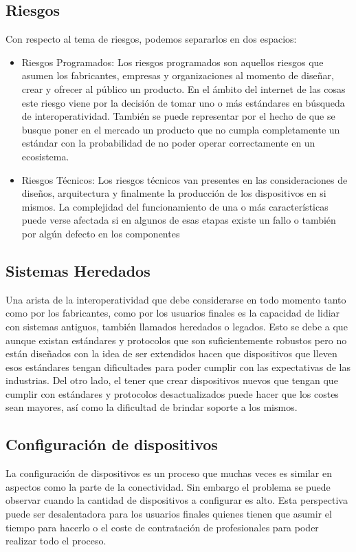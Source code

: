 \subsection{Riesgos}
Con respecto al tema de riesgos, podemos separarlos en dos espacios:
\begin{itemize}
\item Riesgos Programados: Los riesgos programados son aquellos riesgos que asumen los fabricantes, empresas y organizaciones al momento de diseñar, crear y ofrecer al público un producto. En el ámbito del internet de las cosas este riesgo viene por la decisión de tomar uno o más estándares en búsqueda de interoperatividad. También se puede representar por el hecho de que se busque poner en el mercado un producto que no cumpla completamente un estándar con la probabilidad de no poder operar correctamente en un ecosistema.
\item Riesgos Técnicos: Los riesgos técnicos van presentes en las consideraciones de diseños, arquitectura y finalmente la producción de los dispositivos en si mismos. La complejidad del funcionamiento de una o más características puede verse afectada si en algunos de esas etapas existe un fallo o también por algún defecto en los componentes 
\end{itemize}

\subsection{Sistemas Heredados}
Una arista de la interoperatividad que debe considerarse en todo momento tanto como por los fabricantes, como por los usuarios finales es la capacidad de lidiar con sistemas antiguos, también llamados heredados o legados. Esto se debe a que aunque existan estándares y protocolos que son suficientemente robustos pero no están diseñados con la idea de ser extendidos hacen que dispositivos que lleven esos estándares tengan dificultades para poder cumplir con las expectativas de las industrias. Del otro lado, el tener que crear dispositivos nuevos que tengan que cumplir con estándares y protocolos desactualizados puede hacer que los costes sean mayores, así como la dificultad de brindar soporte a los mismos. 

\subsection{Configuración de dispositivos}
La configuración de dispositivos es un proceso que muchas veces es similar en aspectos como la parte de la conectividad. Sin embargo el problema se puede observar cuando la cantidad de dispositivos a configurar es alto. Esta perspectiva puede ser desalentadora para los usuarios finales quienes tienen que asumir el tiempo para hacerlo o el coste de contratación de profesionales para poder realizar todo el proceso. 

